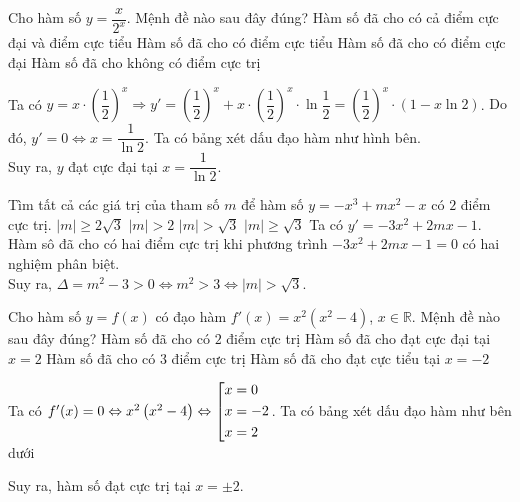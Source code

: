 \begin{ex}%
	Cho hàm số $y=\dfrac{x}{2^x}$. Mệnh đề nào sau đây đúng?
	\choice
	{Hàm số đã cho có cả điểm cực đại và điểm cực tiểu}
	{Hàm số đã cho có điểm cực tiểu}
	{\True Hàm số đã cho có điểm cực đại}
	{Hàm số đã cho không có điểm cực trị}
	\loigiai
	{
		Ta có $y=x\cdot\left(\dfrac{1}{2}\right)^x \Rightarrow y'=\left(\dfrac{1}{2}\right)^x+x\cdot \left(\dfrac{1}{2}\right)^x\cdot\ln \dfrac{1}{2}=\left(\dfrac{1}{2}\right)^x\cdot\left(1-x\ln2\right)$.
		\immini
		{Do đó, $y'=0 \Leftrightarrow x=\dfrac{1}{\ln2}$. Ta có bảng xét dấu đạo hàm như hình bên.\\
			Suy ra, $y$ đạt cực đại tại $ x=\dfrac{1}{\ln2}$.}
		{}
	}
\end{ex}

\begin{ex}%
	Tìm tất cả các giá trị của tham số $m$ để hàm số $y=-x^3+mx^2-x$ có $2$ điểm cực trị.
	\choice
	{$\left|m\right|\ge2\sqrt{3}$}
	{$\left|m\right|>2$}
	{\True $\left|m\right|>\sqrt{3}$}
	{$\left|m\right|\ge\sqrt{3}$}
	\loigiai
	{
		Ta có $y'=-3x^2+2mx-1$.\\
		Hàm sô đã cho có hai điểm cực trị khi phương trình $-3x^2+2mx-1=0$ có hai nghiệm phân biệt.\\
		Suy ra, $\Delta=m^2-3>0 \Leftrightarrow m^2>3 \Leftrightarrow \left|m\right|>\sqrt{3}$.
	}
\end{ex}

\begin{ex}%
	Cho hàm số $y=f(x)$ có đạo hàm $f'(x)=x^2\left(x^2-4\right)$, $x \in \mathbb{R}$. Mệnh đề nào sau đây đúng?
	\choice
	{\True Hàm số đã cho có $2$ điểm cực trị}
	{Hàm số đã cho đạt cực đại tại $x=2$}
	{Hàm số đã cho có $3$ điểm cực trị}
	{Hàm số đã cho đạt cực tiểu tại $x=-2$}
	\loigiai
	{
		Ta có $f'(x)=0 \Leftrightarrow x^2\left(x^2-4\right) \Leftrightarrow \left[\begin{aligned}&x=0\\&x=-2\\&x=2\end{aligned}\right.$. Ta có bảng xét dấu đạo hàm như bên dưới
		\begin{center}
		\end{center}
		Suy ra, hàm số đạt cực trị tại $x=\pm2$.
	}
\end{ex}

